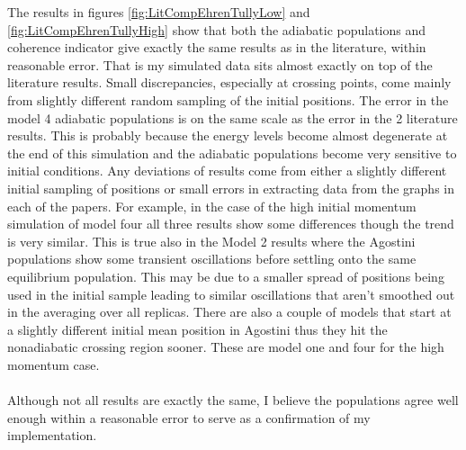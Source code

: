 The results in figures \ref{fig:LitCompEhrenTullyLow} and \ref{fig:LitCompEhrenTullyHigh} show that both the adiabatic populations and coherence indicator give exactly the same results as in the literature, within reasonable error. That is my simulated data sits almost exactly on top of the literature results. Small discrepancies, especially at crossing points, come mainly from slightly different random sampling of the initial positions. The error in the model 4 adiabatic populations is on the same scale as the error in the 2 literature results. This is probably because the energy levels become almost degenerate at the end of this simulation and the adiabatic populations become very sensitive to initial conditions. Any deviations of results come from either a slightly different initial sampling of positions or small errors in extracting data from the graphs in each of the papers. For example, in the case of the high initial momentum simulation of model four all three results show some differences though the trend is very similar. This is true also in the Model 2 results where the Agostini populations show some transient oscillations before settling onto the same equilibrium population. This may be due to a smaller spread of positions being used in the initial sample leading to similar oscillations that aren't smoothed out in the averaging over all replicas. There are also a couple of models that start at a slightly different initial mean position in Agostini \cite{agostini_quantum-classical_2016} thus they hit the nonadiabatic crossing region sooner. These are model one and four for the high momentum case.
\\\\
Although not all results are exactly the same, I believe the populations agree well enough within a reasonable error to serve as a confirmation of my implementation.
